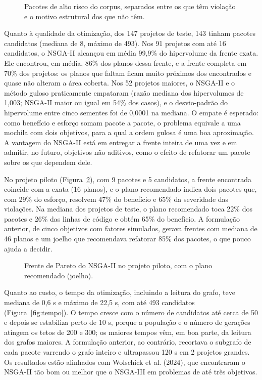 \documentclass[
  a4paper,
]{article}
\begin{document}
\begin{figure}[htbp]
\centering

\caption{Pacotes de alto risco do corpus, separados entre os que têm violação e o motivo estrutural dos que não têm.}
\label{fig:alto-risco}
\end{figure}

Quanto à qualidade da otimização, dos 147 projetos de teste, 143 tinham pacotes candidatos (mediana de 8, máximo de 493). Nos 91 projetos com até 16 candidatos, o NSGA-II alcançou em média 99,9\% do hipervolume da frente exata. Ele encontrou, em média, 86\% dos planos dessa frente, e a frente completa em 70\% dos projetos: os planos que faltam ficam muito próximos dos encontrados e quase não alteram a área coberta. Nos 52 projetos maiores, o NSGA-II e o método guloso praticamente empataram (razão mediana dos hipervolumes de 1,003; NSGA-II maior ou igual em 54\% dos casos), e o desvio-padrão do hipervolume entre cinco sementes foi de 0,0001 na mediana. O empate é esperado: como benefício e esforço somam pacote a pacote, o problema equivale a uma mochila com dois objetivos, para a qual a ordem gulosa é uma boa aproximação. A vantagem do NSGA-II está em entregar a frente inteira de uma vez e em admitir, no futuro, objetivos não aditivos, como o efeito de refatorar um pacote sobre os que dependem dele.

No projeto piloto (Figura~\ref{fig:piloto}), com 9 pacotes e 5 candidatos, a frente encontrada coincide com a exata (16 planos), e o plano recomendado indica dois pacotes que, com 29\% do esforço, resolvem 47\% do benefício e 65\% da severidade das violações. Na mediana dos projetos de teste, o plano recomendado toca 22\% dos pacotes e 26\% das linhas de código e obtém 65\% do benefício. A formulação anterior, de cinco objetivos com fatores simulados, gerava frentes com mediana de 46 planos e um joelho que recomendava refatorar 85\% dos pacotes, o que pouco ajuda a decidir.

\begin{figure}[htbp]
\centering

\caption{Frente de Pareto do NSGA-II no projeto piloto, com o plano recomendado (joelho).}
\label{fig:piloto}
\end{figure}

Quanto ao custo, o tempo da otimização, incluindo a leitura do grafo, teve mediana de 0,6 s e máximo de 22,5 s, com até 493 candidatos (Figura~\ref{fig:tempo}). O tempo cresce com o número de candidatos até cerca de 50 e depois se estabiliza perto de 10 s, porque a população e o número de gerações atingem os tetos de 200 e 300; os maiores tempos vêm, em boa parte, da leitura dos grafos maiores. A formulação anterior, ao contrário, recortava o subgrafo de cada pacote varrendo o grafo inteiro e ultrapassou 120 s em 2 projetos grandes. Os resultados estão alinhados com Wolschick et al. (2024), que encontraram o NSGA-II tão bom ou melhor que o NSGA-III em problemas de até três objetivos.
\end{document}

